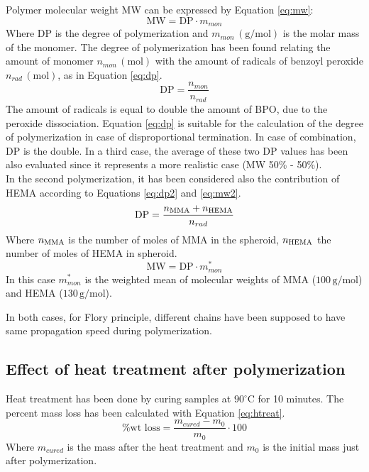 \documentclass[a4paper, 11pt]{article}
\begin{document}
Polymer molecular weight MW can be expressed by Equation \ref{eq:mw}:
\begin{equation}
\text{MW} = \text{DP}\cdot m_{mon}
\label{eq:mw} 
\end{equation}
Where DP is the degree of polymerization and $m_{mon}\,(\text{g}/\text{mol})$ is the molar mass of the monomer. The degree of polymerization has been found relating the amount of monomer $n_{mon}\,(\text{mol})$ with the amount of radicals of benzoyl peroxide $n_{rad}\,(\text{mol})$, as in Equation \ref{eq:dp}.
\begin{equation}
\text{DP} = \frac{n_{mon}}{n_{rad}}
\label{eq:dp} 
\end{equation}
The amount of radicals is equal to double the amount of BPO, due to the peroxide dissociation. Equation \ref{eq:dp} is suitable for the calculation of the degree of polymerization in case of disproportional termination. In case of combination, DP is the double. In a third case, the average of these two DP values has been also evaluated since it represents a more realistic case (MW 50\% - 50\%).\\
In the second polymerization, it has been considered also the contribution of HEMA according to Equations \ref{eq:dp2} and \ref{eq:mw2}.
\begin{equation}
\text{DP} = \frac{n_\textup{MMA} + n_\textup{HEMA}}{n_{rad}}
\label{eq:dp2} 
\end{equation}
Where $n_\textup{MMA}$ is the number of moles of MMA in the spheroid, $n_\textup{HEMA}$ the number of moles of HEMA in spheroid.
\begin{equation}
\text{MW} = \text{DP}\cdot m^*_{mon}
\label{eq:mw2} 
\end{equation}
In this case $m^*_{mon}$ is the weighted mean of molecular weights of MMA ($100\,\text{g/mol}$) and HEMA ($130\,\text{g/mol}$). \par 
In both cases, for Flory principle, different chains have been supposed to have same propagation speed during polymerization. 

\subsection{Effect of heat treatment after polymerization}

Heat treatment has been done by curing samples at $90^\circ$C for 10 minutes. The percent mass loss has been calculated with Equation \ref{eq:htreat}.
\begin{equation}
\%\text{wt loss} = \frac{m_{cured}-m_0}{m_0}\cdot 100
\label{eq:htreat} 
\end{equation}
Where $m_{cured}$ is the mass after the heat treatment and $m_0$ is the initial mass just after polymerization. 
\end{document}
